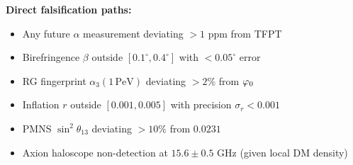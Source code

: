 \begin{tcolorbox}[colback=gray!5, colframe=gray!60, title={\textbf{Claim Map: What This Paper Establishes}}, fonttitle=\bfseries]
\textbf{Direct falsification paths:}
\begin{itemize}[leftmargin=1.5em, topsep=2pt, itemsep=1pt]
    \item Any future $\alpha$ measurement deviating $>1$ ppm from TFPT
    \item Birefringence $\beta$ outside $[0.1^\circ, 0.4^\circ]$ with $<0.05^\circ$ error
    \item RG fingerprint $\alpha_3(1\,\mathrm{PeV})$ deviating $>2\%$ from $\varphi_0$
    \item Inflation $r$ outside $[0.001, 0.005]$ with precision $\sigma_r < 0.001$
    \item PMNS $\sin^2\theta_{13}$ deviating $>10\%$ from $0.0231$
    \item Axion haloscope non-detection at $15.6 \pm 0.5$ GHz (given local DM density)
\end{itemize}
\end{tcolorbox}

